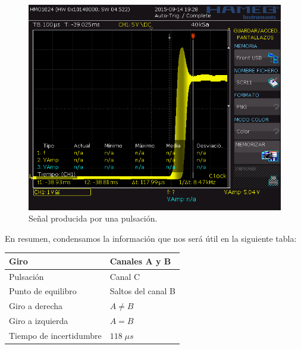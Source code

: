 \begin{figure}[H]
	\noindent \begin{centering}
		\includegraphics[width=\linewidth*2/3]{capitulo3/rebotes}
		\par\end{centering}
	\smallskip
	\caption{\label{fig:rebotes} Señal producida por una pulsación.}
\end{figure} 

\smallskip

En resumen, condensamos la información que nos será útil en la siguiente tabla:

\smallskip

\begin{center}
	\begin{tabular}{|l|l|}
		\hline Giro & Canales A y B \\ 
		\hline Pulsación & Canal C \\ 
		\hline Punto de equilibro & Saltos del canal B \\ 
		\hline Giro a derecha & $A\neq B$ \\ 
		\hline Giro a izquierda & $A=B$ \\
		\hline Tiempo de incertidumbre & $118 \; \mu s$\\
		\hline 
	\end{tabular}
	\smallskip
\end{center} 

\smallskip

